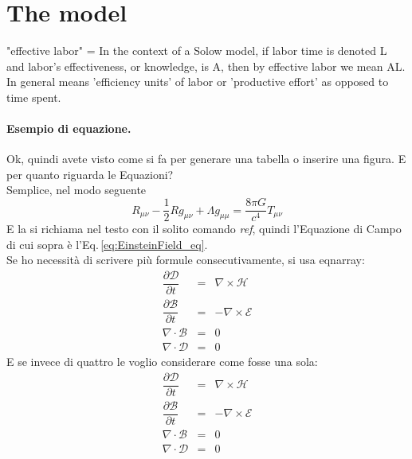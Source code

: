 \section{The model}\label{Sec:model}
 "effective labor" = In the context of a Solow model, if labor time is denoted L and labor's effectiveness, or knowledge, is A, then by effective labor we mean AL. In general means 'efficiency units' of labor or 'productive effort' as opposed to time spent. 
\paragraph{Esempio di equazione.} %
Ok, quindi avete visto come si fa per generare una tabella o inserire una figura. E per quanto riguarda le Equazioni?\\
Semplice, nel modo seguente
\begin{equation}\label{eq:EinsteinField_eq}
R_{\mu \nu} - \dfrac{1}{2} R g_{\mu \nu} + \Lambda g_{\mu \mu} = \dfrac{8 \pi G}{c^4} T_{\mu \nu}
\end{equation}
E la si richiama nel testo con il solito comando {\it ref}, quindi l'Equazione di Campo di cui sopra è l'Eq.\,\ref{eq:EinsteinField_eq}.\\
Se ho necessità di scrivere più formule consecutivamente, si usa eqnarray:
\begin{eqnarray}
\dfrac{\partial \mathcal D}{\partial t} &=& \nabla \times \mathcal H \\
\dfrac{\partial \mathcal B}{\partial t} &=& -\nabla \times \mathcal E \\
\nabla \cdot \mathcal B  &=& 0 \\
\nabla \cdot \mathcal D  &=& 0 
\end{eqnarray}
E se invece di quattro le voglio considerare come fosse una sola:
\begin{eqnarray}\label{eq:Maxwell_eq}
\dfrac{\partial \mathcal D}{\partial t} &=& \nabla \times \mathcal H \nonumber \\
\dfrac{\partial \mathcal B}{\partial t} &=& -\nabla \times \mathcal E \nonumber \\
\nabla \cdot \mathcal B  &=& 0 \nonumber \\
\nabla \cdot \mathcal D  &=& 0 
\end{eqnarray}

